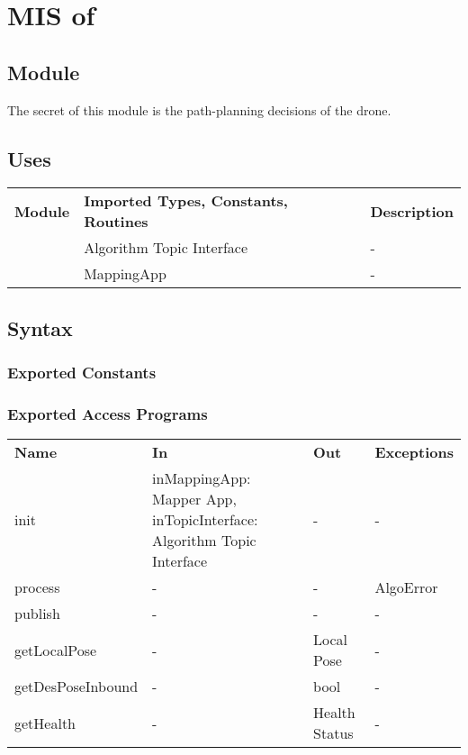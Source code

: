 \documentclass[12pt, titlepage]{article}
\begin{document}
\section{MIS of } \label{PATH_PLAN_APP} 
\subsection{Module}
The secret of this module is the path-planning decisions of the drone. 
\subsection{Uses}
\begin{center}
\begin{tabular}{p{2 cm} p{5cm} p{6.5cm} } 
\hline
\textbf{Module} & \textbf{Imported Types, Constants, Routines} & \textbf{Description} \\
\nameref{Algorithm Topic Interface} & Algorithm Topic Interface & - \\
\nameref{Mapper App} & MappingApp & - \\
\hline
\hline
\end{tabular}
\end{center}
\subsection{Syntax}
\subsubsection{Exported Constants}
\subsubsection{Exported Access Programs}
\begin{center}
\begin{tabular}{p{3.5cm} p{2.5cm} p{2.5cm} p{5cm}}
\hline
\textbf{Name} & \textbf{In} & \textbf{Out} & \textbf{Exceptions} \\
init & inMappingApp: Mapper App, inTopicInterface: Algorithm Topic Interface & - & - \\
process & - & - & AlgoError \\
publish & - & - & - \\
getLocalPose & - & Local Pose & - \\
getDesPoseInbound & - & bool & - \\
getHealth & - & Health Status & - \\
\hline
\hline
\end{tabular}
\end{center}
\end{document}
